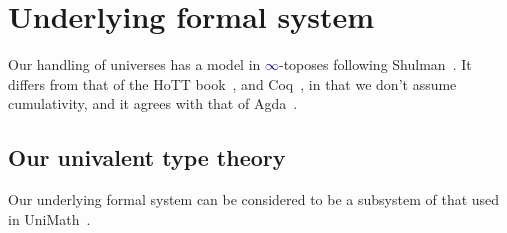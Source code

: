 \documentclass[10pt]{article}
\newcommand{\db}{\textcolor{darkblue}}
\newcommand{\m}[1]{\db{$#1$}}
\theoremstyle{definition}
\begin{document}
\section{Underlying formal system} \label{foundations}

Our handling of universes has a model in \m{\infty}-toposes following
Shulman~\cite{2019arXiv190407004S}. It differs from that of the HoTT
book~\cite{hottbook}, and Coq~\cite{coq}, in that we don't assume
cumulativity, and it agrees with that of Agda~\cite{agda}.

\subsection{Our univalent type theory}

Our underlying formal system can be considered to be a subsystem of that
used in UniMath~\cite{unimath}.
\end{document}
